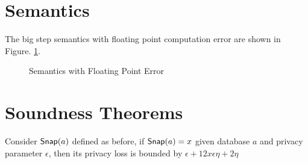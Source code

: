 \documentclass[a4paper,11pt]{article}
\begin{document}
\section{Semantics}
The big step semantics with floating point computation error are shown in Figure. \ref{fig_semantics}.
\begin{figure}
\caption{Semantics with Floating Point Error}
\label{fig_semantics}
\end{figure}



\section{Soundness Theorems}


\begin{thm}
Consider $\mathsf{Snap}(a)$ defined as before, if $\mathsf{Snap}(a) = x$ given database $a$ and privacy parameter $\epsilon$, then its privacy loss is bounded by $\epsilon + 12 x \epsilon \eta + 2\eta$
\end{thm}
\end{document}
